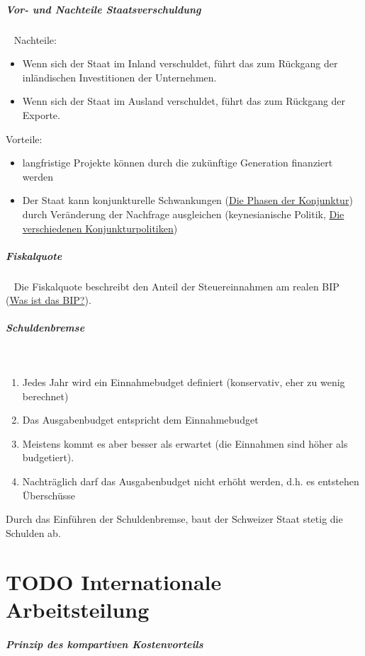 \documentclass[11pt,twoside,landscape]{article}
\begin{document}
\begin{multicols}{3}
\subparagraph{Vor- und Nachteile Staatsverschuldung} \
\label{sec:org102db11}
Nachteile:
\begin{itemize}
\item Wenn sich der Staat im Inland verschuldet, führt das zum Rückgang der inländischen Investitionen der Unternehmen.
\item Wenn sich der Staat im Ausland verschuldet, führt das zum Rückgang der Exporte.
\end{itemize}

Vorteile:
\begin{itemize}
\item langfristige Projekte können durch die zukünftige Generation finanziert werden
\item Der Staat kann konjunkturelle Schwankungen (\href{../../../roam/20220614102344-die_phasen_der_konjunktur.org}{Die Phasen der Konjunktur}) durch Veränderung der Nachfrage ausgleichen (keynesianische Politik, \href{../../../roam/20220614161544-die_verschiedenen_konjunkturpolitiken.org}{Die verschiedenen Konjunkturpolitiken})
\end{itemize}

\subparagraph{Fiskalquote} \
\label{sec:org7d7fbe3}
Die Fiskalquote beschreibt den Anteil der Steuereinnahmen am realen BIP (\href{../../../roam/20220504151208-was_ist_das_bip.org}{Was ist das BIP?}).

\subparagraph{Schuldenbremse} \
\label{sec:org25d1964}
\begin{enumerate}
\item Jedes Jahr wird ein Einnahmebudget definiert (konservativ, eher zu wenig berechnet)
\item Das Ausgabenbudget entspricht dem Einnahmebudget
\item Meistens kommt es aber besser als erwartet (die Einnahmen sind höher als budgetiert).
\item Nachträglich darf das Ausgabenbudget nicht erhöht werden, d.h. es entstehen Überschüsse
\end{enumerate}


Durch das Einführen der Schuldenbremse, baut der Schweizer Staat stetig die Schulden ab.

\section{{\bfseries\sffamily TODO} Internationale Arbeitsteilung}
\label{sec:org0f090e8}
\subparagraph{Prinzip des kompartiven Kostenvorteils} \
\label{sec:orgda86ad8}


\end{multicols}
\end{document}
